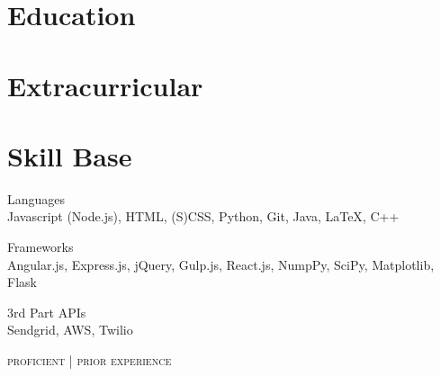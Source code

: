 \documentclass[9pt]{article}
\begin{document}
\begin{minipage}[t]{0.35\textwidth}
  \vspace{0pt}

  \section{Education}

    

    

  \section{Extracurricular}

    

    

    

  \section{Skill Base}
  {\raggedright
    Languages \\
    {\small
      {\color{highlight}
        Javascript (Node.js), HTML, (S)CSS, Python, Git,
      }
      Java, LaTeX, C++
    }
    \vspace{5pt}

    Frameworks \\
    {\small
      {\color{highlight}
        Angular.js, Express.js, jQuery, Gulp.js,
      }
      React.js, NumpPy, SciPy, Matplotlib, Flask \\
    }

    \vspace{5pt}

    3rd Part APIs \\
    {\small
      {\color{highlight}
        Sendgrid, AWS,
      }
      Twilio
    }

    \hfill\textsc{\footnotesize{{\color{highlight} proficient} | prior experience}}
  }
\end{minipage}
\end{document}
